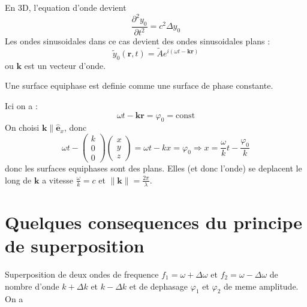 En 3D, l'equation d'onde devient 
$$
\frac{ \partial^{2}y_{0} }{ \partial t^{2} } =c^{2}\Delta y_{0}
$$
Les ondes sinusoidales dans ce cas devient des ondes sinusoidales plans : 
$$
\tilde{y}_{0}(\boldsymbol{r},t)=\tilde{A}e^{i(\omega t-\boldsymbol{k}\boldsymbol{r})}
$$
ou $\boldsymbol{k}$ est un vecteur d'onde.
\begin{definition}
Une surface equiphase est definie comme une surface de phase constante.
\end{definition}
Ici on a :
$$
\omega t-\boldsymbol{kr}=\varphi _{0}=\mathrm{const}
$$
On choisi $\boldsymbol{k} \parallel \boldsymbol{\hat{e}}_{x}$, donc
$$
\omega t-\begin{pmatrix}
k \\
0 \\
0 
\end{pmatrix}\begin{pmatrix}
x \\
y \\
z
\end{pmatrix}=\omega t-kx=\varphi_{0}\Rightarrow x=\frac{\omega}{k}t-\frac{\varphi_{0}}{k}
$$
donc les surfaces equiphases sont des plans. Elles (et donc l'onde) se deplacent le long de $\boldsymbol{k}$ a vitesse $\frac{\omega}{k}=c$ et $\lVert \boldsymbol{k} \rVert=\frac{2\pi}{\lambda}$.

\section{Quelques consequences du principe de superposition}

Superposition de deux ondes de frequence $f_{1}=\omega +\Delta \omega$ et $f_{2}=\omega-\Delta \omega$ de nombre d'onde $k+\Delta k$ et $k-\Delta k$ et de dephasage $\varphi_{1}$ et $\varphi_{2}$ de meme amplitude. On a

